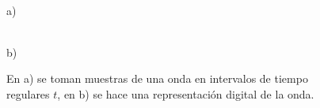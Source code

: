 \begin{figure}[h!]
\centering
\begin{minipage}[c][5cm][t]{.5\textwidth}
\centering

\\a)
\end{minipage}%
\begin{minipage}[c][5cm][t]{.5\textwidth}
\centering

\\b)
\end{minipage}%
\caption[Proceso de muestreo]{En a) se toman muestras de una onda en intervalos de tiempo regulares $t$, en b) se hace una representaci\'on digital de la onda.}
\label{fig:muest}
\end{figure}